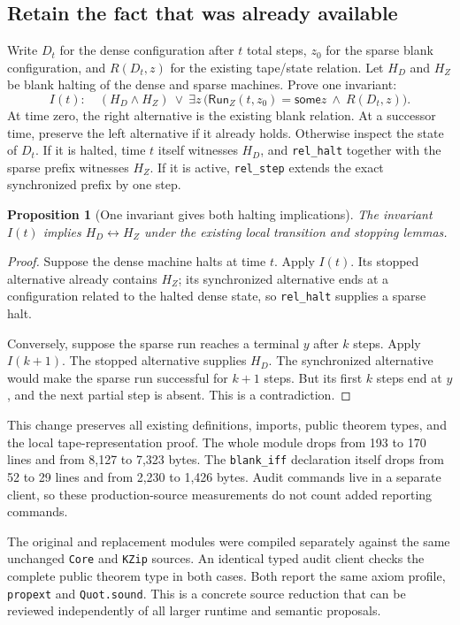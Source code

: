 \documentclass[11pt,letterpaper]{article}
\newcommand{\code}[1]{\texttt{#1}}
\newcommand{\Run}{\mathsf{Run}}
\newcommand{\Some}{\mathsf{some}}
\newtheorem{proposition}[theorem]{Proposition}
\begin{document}
\subsection{Retain the fact that was already available}

Write $D_t$ for the dense configuration after $t$ total steps, $z_0$ for the sparse
blank configuration, and $R(D_t,z)$ for the existing tape/state relation. Let $H_D$
and $H_Z$ be blank halting of the dense and sparse machines. Prove one invariant:
\[
 I(t):\quad
  (H_D\wedge H_Z)\ \lor\
  \exists z\,
  \bigl(\Run_Z(t,z_0)=\Some z\ \wedge\ R(D_t,z)\bigr).
\]
At time zero, the right alternative is the existing blank relation. At a successor
time, preserve the left alternative if it already holds. Otherwise inspect the state
of $D_t$. If it is halted, time $t$ itself witnesses $H_D$, and \code{rel\_halt}
together with the sparse prefix witnesses $H_Z$. If it is active,
\code{rel\_step} extends the exact synchronized prefix by one step.

\begin{proposition}[One invariant gives both halting implications]
The invariant $I(t)$ implies $H_D\leftrightarrow H_Z$ under the existing local
transition and stopping lemmas.
\end{proposition}
\begin{proof}
Suppose the dense machine halts at time $t$. Apply $I(t)$. Its stopped alternative
already contains $H_Z$; its synchronized alternative ends at a configuration related
to the halted dense state, so \code{rel\_halt} supplies a sparse halt.

Conversely, suppose the sparse run reaches a terminal $y$ after $k$ steps. Apply
$I(k+1)$. The stopped alternative supplies $H_D$. The synchronized alternative would
make the sparse run successful for $k+1$ steps. But its first $k$ steps end at $y$,
and the next partial step is absent. This is a contradiction.
\end{proof}

This change preserves all existing definitions, imports, public theorem types, and
the local tape-representation proof. The whole module drops from 193 to 170 lines
and from 8,127 to 7,323 bytes. The \code{blank\_iff} declaration itself drops from
52 to 29 lines and from 2,230 to 1,426 bytes. Audit commands live in a separate client,
so these production-source measurements do not count added reporting commands.

The original and replacement modules were compiled separately against the same
unchanged \code{Core} and \code{KZip} sources. An identical typed audit client checks
the complete public theorem type in both cases. Both report the same axiom profile,
\code{propext} and \code{Quot.sound}. This is a concrete source reduction that can
be reviewed independently of all larger runtime and semantic proposals.
\end{document}
